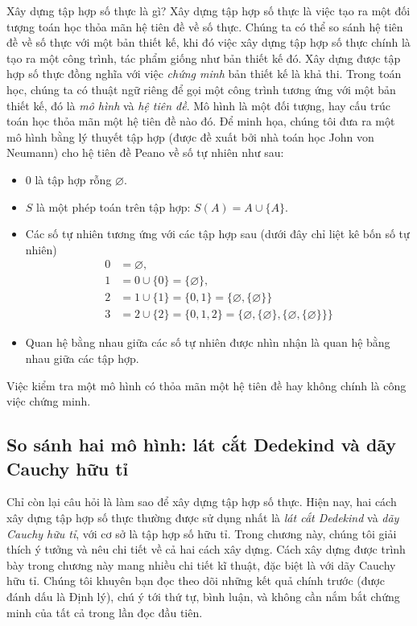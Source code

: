 Xây dựng tập hợp số thực là gì? Xây dựng tập hợp số thực là việc tạo ra một đối tượng toán học thỏa mãn hệ tiên đề về số thực. Chúng ta có thể so sánh hệ tiên đề về số thực với một bản thiết kế, khi đó việc xây dựng tập hợp số thực chính là tạo ra một công trình, tác phẩm giống như bản thiết kế đó. Xây dựng được tập hợp số thực đồng nghĩa với việc \textit{chứng minh} bản thiết kế là khả thi. Trong toán học, chúng ta có thuật ngữ riêng để gọi một công trình tương ứng với một bản thiết kế, đó là \textit{mô hình} và \textit{hệ tiên đề}. Mô hình là một đối tượng, hay cấu trúc toán học thỏa mãn một hệ tiên đề nào đó. Để minh họa, chúng tôi đưa ra một mô hình bằng lý thuyết tập hợp (được đề xuất bởi nhà toán học John von Neumann) cho hệ tiên đề Peano về số tự nhiên như sau:
\begin{itemize}
    \item $0$ là tập hợp rỗng $\varnothing$.
    \item $S$ là một phép toán trên tập hợp: $S(A) = A \cup \{ A \}$.
    \item Các số tự nhiên tương ứng với các tập hợp sau (dưới đây chỉ liệt kê bốn số tự nhiên)
          \begin{align*}
              0 & = \varnothing,                                                                                                \\
              1 & = 0 \cup \{ 0 \} = \{ \varnothing \},                                                                         \\
              2 & = 1 \cup \{ 1 \} = \{ 0, 1 \}  = \{ \varnothing, \{ \varnothing \} \}                                         \\
              3 & = 2 \cup \{ 2 \} = \{ 0, 1, 2 \} = \{ \varnothing, \{ \varnothing \}, \{ \varnothing, \{ \varnothing \} \} \}
          \end{align*}
    \item Quan hệ bằng nhau giữa các số tự nhiên được nhìn nhận là quan hệ bằng nhau giữa các tập hợp.
\end{itemize}

Việc kiểm tra một mô hình có thỏa mãn một hệ tiên đề hay không chính là công việc chứng minh.

\subsection{So sánh hai mô hình: lát cắt Dedekind và dãy Cauchy hữu tỉ}

Chỉ còn lại câu hỏi là làm sao để xây dựng tập hợp số thực. Hiện nay, hai cách xây dựng tập hợp số thực thường được sử dụng nhất là \textit{lát cắt Dedekind} và \textit{dãy Cauchy hữu tỉ}, với cơ sở là tập hợp số hữu tỉ. Trong chương này, chúng tôi giải thích ý tưởng và nêu chi tiết về cả hai cách xây dựng. Cách xây dựng được trình bày trong chương này mang nhiều chi tiết kĩ thuật, đặc biệt là với dãy Cauchy hữu tỉ. Chúng tôi khuyên bạn đọc theo dõi những kết quả chính trước (được đánh dấu là Định lý), chú ý tới thứ tự, bình luận, và không cần nắm bắt chứng minh của tất cả trong lần đọc đầu tiên.

